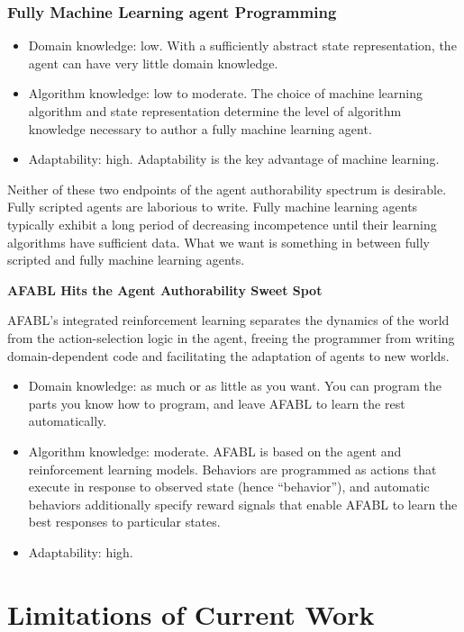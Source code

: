 \subsubsection{Fully Machine Learning agent Programming}

\begin{itemize}
\item Domain knowledge: low. With a sufficiently abstract state representation, the agent can have very little domain knowledge.
\item Algorithm knowledge: low to moderate.  The choice of machine learning algorithm and state representation determine the level of algorithm knowledge necessary to author a fully machine learning agent.
\item Adaptability: high.  Adaptability is the key advantage of machine learning.
\end{itemize}

Neither of these two endpoints of the agent authorability spectrum is desirable.  Fully scripted agents are laborious to write.  Fully machine learning agents typically exhibit a long period of decreasing incompetence until their learning algorithms have sufficient data.  What we want is something in between fully scripted and fully machine learning agents.


{\bf AFABL Hits the Agent Authorability Sweet Spot}

AFABL's integrated reinforcement learning separates the dynamics of the world from the action-selection logic in the agent, freeing the programmer from writing domain-dependent code and facilitating the adaptation of agents to new worlds.

\begin{itemize}
\item Domain knowledge: as much or as little as you want.  You can program the parts you know how to program, and leave AFABL to learn the rest automatically.
\item Algorithm knowledge: moderate.  AFABL is based on the agent and reinforcement learning models.  Behaviors are programmed as actions that execute in response to observed state (hence ``behavior''), and automatic behaviors additionally specify reward signals that enable AFABL to learn the best responses to particular states.
\item Adaptability: high.
\end{itemize}


\section{Limitations of Current Work}

